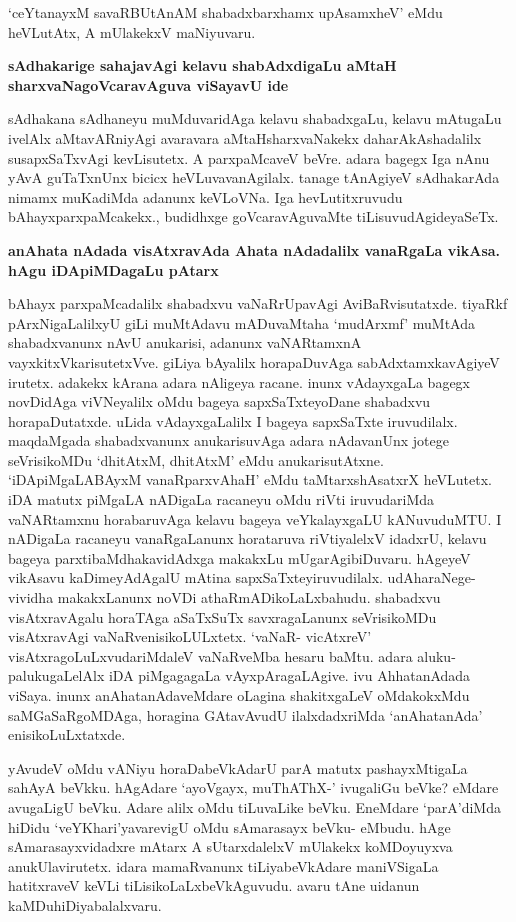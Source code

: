 `ceYtanayxM savaRBUtAnAM shabadxbarxhamx upAsamxheV' eMdu heVLutAtx, A mUlakekxV maNiyuvaru.

{\bf sAdhakarige sahajavAgi kelavu shabAdxdigaLu aMtaH sharxvaNagoVcaravAguva viSayavU ide}

sAdhakana sAdhaneyu muMduvaridAga kelavu shabadxgaLu, kelavu mAtugaLu ivelAlx aMtavARniyAgi avaravara aMtaHsharxvaNakekx daharAkAshadalilx susapxSaTxvAgi kevLisutetx. A parxpaMcaveV beVre. adara bagegx Iga nAnu yAvA guTaTxnUnx bicicx heVLuvavanAgilalx. tanage tAnAgiyeV sAdhakarAda nimamx muKadiMda adanunx keVLoVNa. Iga hevLutitxruvudu bAhayxparxpaMcakekx., budidhxge goVcaravAguvaMte tiLisuvudAgideyaSeTx.

{\bf anAhata nAdada visAtxravAda Ahata nAdadalilx vanaRgaLa vikAsa. hAgu iDApiMDagaLu pAtarx}

bAhayx parxpaMcadalilx shabadxvu vaNaRrUpavAgi AviBaRvisutatxde. tiyaRkf pArxNigaLalilxyU giLi muMtAdavu mADuvaMtaha `mudArxmf' muMtAda shabadxvanunx nAvU anukarisi, adanunx vaNARtamxnA vayxkitxVkarisutetxVve. giLiya bAyalilx horapaDuvAga sabAdxtamxkavAgiyeV irutetx. adakekx kArana adara nAligeya racane. inunx vAdayxgaLa bagegx novDidAga viVNeyalilx oMdu bageya sapxSaTxteyoDane shabadxvu horapaDutatxde. uLida vAdayxgaLalilx I bageya sapxSaTxte iruvudilalx. maqdaMgada shabadxvanunx anukarisuvAga adara nAdavanUnx jotege seVrisikoMDu `dhitAtxM, dhitAtxM' eMdu anukarisutAtxne. `iDApiMgaLABAyxM vanaRparxvAhaH' eMdu taMtarxshAsatxrX heVLutetx. iDA matutx piMgaLA nADigaLa racaneyu oMdu riVti iruvudariMda vaNARtamxnu horabaruvAga kelavu bageya veYkalayxgaLU kANuvuduMTU. I nADigaLa racaneyu vanaRgaLanunx horataruva riVtiyalelxV idadxrU, kelavu bageya parxtibaMdhakavidAdxga makakxLu mUgarAgibiDuvaru. hAgeyeV vikAsavu kaDimeyAdAgalU mAtina sapxSaTxteyiruvudilalx. udAharaNege- vividha makakxLanunx noVDi athaRmADikoLaLxbahudu. shabadxvu visAtxravAgalu horaTAga aSaTxSuTx savxragaLanunx seVrisikoMDu visAtxravAgi vaNaRvenisikoLULxtetx. `vaNaR- vicAtxreV' visAtxragoLuLxvudariMdaleV vaNaRveMba hesaru baMtu. adara aluku-palukugaLelAlx iDA piMgagagaLa vAyxpAragaLAgive. ivu AhhatanAdada viSaya. inunx anAhatanAdaveMdare oLagina shakitxgaLeV oMdakokxMdu saMGaSaRgoMDAga, horagina GAtavAvudU ilalxdadxriMda `anAhatanAda' enisikoLuLxtatxde.

yAvudeV oMdu vANiyu horaDabeVkAdarU parA matutx pashayxMtigaLa sahAyA beVkku. hAgAdare `ayoVgayx, muThAThX-' ivugaliGu beVke? eMdare avugaLigU beVku. Adare alilx oMdu tiLuvaLike beVku. EneMdare `parA'diMda hiDidu `veYKhari'yavarevigU oMdu sAmarasayx beVku- eMbudu. hAge sAmarasayxvidadxre mAtarx A sUtarxdalelxV mUlakekx koMDoyuyxva anukUlavirutetx. idara mamaRvanunx tiLiyabeVkAdare maniVSigaLa hatitxraveV keVLi tiLisikoLaLxbeVkAguvudu. avaru tAne uidanun kaMDuhiDiyabalalxvaru.

